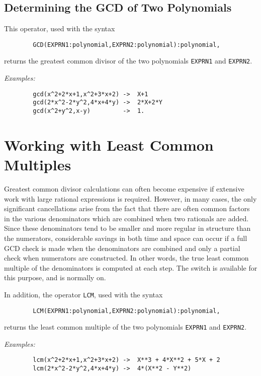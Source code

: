 \subsection{Determining the GCD of Two Polynomials}
\hypertarget{operator:GCD}{}
This operator, used with the syntax
\begin{verbatim}
        GCD(EXPRN1:polynomial,EXPRN2:polynomial):polynomial,
\end{verbatim}
returns the greatest common divisor of the two polynomials \texttt{EXPRN1} and
\texttt{EXPRN2}.

\textit{Examples:}
\begin{verbatim}
        gcd(x^2+2*x+1,x^2+3*x+2) ->  X+1
        gcd(2*x^2-2*y^2,4*x+4*y) ->  2*X+2*Y
        gcd(x^2+y^2,x-y)         ->  1.
\end{verbatim}

\section{Working with Least Common Multiples}
\hypertarget{switch:LCM}{}

Greatest common divisor calculations can often become expensive if
extensive work with large rational expressions is required. However, in
many cases, the only significant cancellations arise from the fact that
there are often common factors in the various denominators which are
combined when two rationals are added. Since these denominators tend to be
smaller and more regular in structure than the numerators, considerable
savings in both time and space can occur if a full GCD check is made when
the denominators are combined and only a partial check when numerators are
constructed. In other words, the true least common multiple of the
denominators is computed at each step. The switch 
is available for this purpose, and is normally on.

\hypertarget{operator:LCM}{}
In addition, the operator \texttt{LCM}, used with the syntax
\begin{verbatim}
        LCM(EXPRN1:polynomial,EXPRN2:polynomial):polynomial,
\end{verbatim}
returns the least common multiple of the two polynomials \texttt{EXPRN1} and
\texttt{EXPRN2}.

\textit{Examples:}
\begin{verbatim}
        lcm(x^2+2*x+1,x^2+3*x+2) ->  X**3 + 4*X**2 + 5*X + 2
        lcm(2*x^2-2*y^2,4*x+4*y) ->  4*(X**2 - Y**2)
\end{verbatim}

